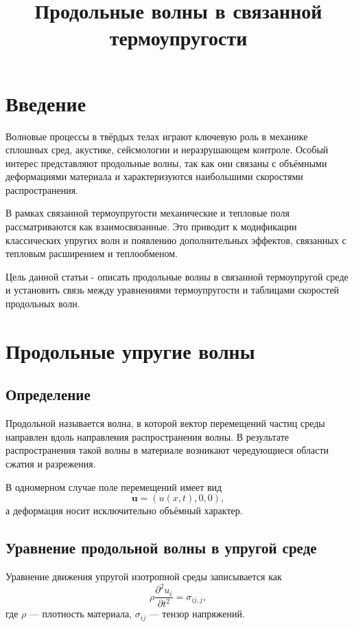 \documentclass[12pt]{article}
\title{Продольные волны в связанной термоупругости}
\author{}
\date{}
\begin{document}
\maketitle

\section{Введение}

Волновые процессы в твёрдых телах играют ключевую роль в механике сплошных сред,
акустике, сейсмологии и неразрушающем контроле.
Особый интерес представляют продольные волны,
так как они связаны с объёмными деформациями материала
и характеризуются наибольшими скоростями распространения.

В рамках связанной термоупругости механические и тепловые поля
рассматриваются как взаимосвязанные.
Это приводит к модификации классических упругих волн
и появлению дополнительных эффектов,
связанных с тепловым расширением и теплообменом.

Цель данной статьи - описать продольные волны
в связанной термоупругой среде
и установить связь между уравнениями термоупругости
и таблицами скоростей продольных волн.

\section{Продольные упругие волны}

\subsection{Определение}

Продольной называется волна,
в которой вектор перемещений частиц среды
направлен вдоль направления распространения волны.
В результате распространения такой волны
в материале возникают чередующиеся области сжатия и разрежения.

В одномерном случае поле перемещений имеет вид
\begin{equation}
\mathbf{u} = (u(x,t), 0, 0),
\end{equation}
а деформация носит исключительно объёмный характер.

\subsection{Уравнение продольной волны в упругой среде}

Уравнение движения упругой изотропной среды записывается как
\begin{equation}
\rho \frac{\partial^2 u_i}{\partial t^2}
=
\sigma_{ij,j},
\end{equation}
где $\rho$ — плотность материала,
$\sigma_{ij}$ — тензор напряжений.
\end{document}
